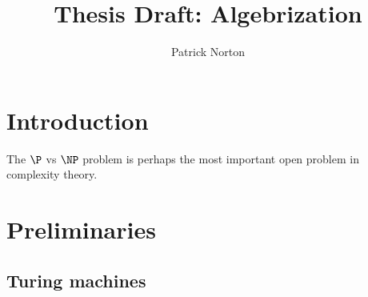 

\usepackage[linesnumbered]{algorithm2e}
\usepackage{biblatex}
\usepackage{imakeidx}
\usepackage{microtype}




\makeindex

\title{Thesis Draft: Algebrization}
\author{Patrick Norton}



\maketitle

\section{Introduction}

The $\P$ vs $\NP$ problem is perhaps the most important open problem in
complexity theory.

\section{Preliminaries}


\subsection{Turing machines}


